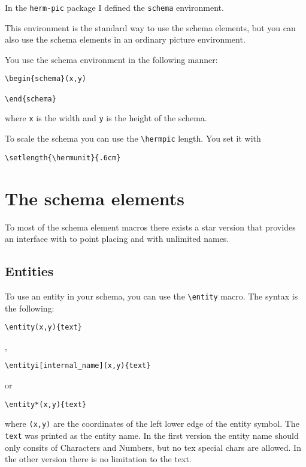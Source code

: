 \documentclass[a4paper,11pt]{article}
\begin{document}
In the {\tt herm-pic} package I defined the {\tt schema} environment.

This environment is the standard way to use the schema elements, but you 
can also use the schema elements in an ordinary picture environment.

You use the schema environment in the following manner:

\begin{verbatim}
\begin{schema}(x,y)

\end{schema}
\end{verbatim}

where {\tt x} is the width and {\tt y} is the height of 
the schema.

To scale the schema you can use the \verb|\hermpic| length.
You set it with

\begin{verbatim}
\setlength{\hermunit}{.6cm}
\end{verbatim}

\section{The schema elements}

To most of the schema element macros there exists a star version that
provides an interface with to point placing and with unlimited names.

\subsection{Entities}

To use an entity in your schema, you can use the \verb|\entity| macro.
The syntax is the following:

\begin{verbatim}
\entity(x,y){text}
\end{verbatim}

,

\begin{verbatim}
\entityi[internal_name](x,y){text}
\end{verbatim}

or 

\begin{verbatim}
\entity*(x,y){text}
\end{verbatim}

where {\tt (x,y)} are the coordinates of the left lower edge of the entity
symbol. The {\tt text} was printed as the entity name. In the first version 
the entity name should only consits of Characters and Numbers, 
but no tex special chars are allowed.
In the other version there is no limitation to the text.
\end{document}
